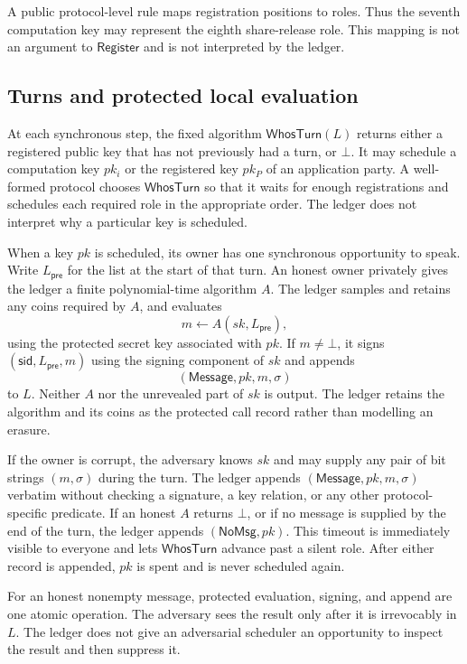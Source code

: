 A public protocol-level rule maps registration positions to roles. Thus the
seventh computation key may represent the eighth share-release role. This
mapping is not an argument to $\mathsf{Register}$ and is not interpreted by
the ledger.

\subsection{Turns and protected local evaluation}

At each synchronous step, the fixed algorithm $\mathsf{WhosTurn}(L)$ returns
either a registered public key that has not previously had a turn, or
$\bot$. It may schedule a computation key $pk_i$ or the registered key
$pk_P$ of an application party. A well-formed protocol chooses
$\mathsf{WhosTurn}$ so that it waits for enough registrations and schedules
each required role in the appropriate order. The ledger does not interpret
why a particular key is scheduled.

When a key $pk$ is scheduled, its owner has one synchronous opportunity to
speak. Write $L_{\mathsf{pre}}$ for the list at the start of that turn. An
honest owner privately gives the ledger a finite polynomial-time algorithm
$A$. The ledger samples and retains any coins required by $A$, and evaluates
\[
  m\leftarrow A(sk,L_{\mathsf{pre}}),
\]
using the protected secret key associated with $pk$. If $m\neq\bot$, it
signs $(\mathsf{sid},L_{\mathsf{pre}},m)$ using the signing component of $sk$
and appends
\[
  (\mathsf{Message},pk,m,\sigma)
\]
to $L$. Neither $A$ nor the unrevealed part of $sk$ is output. The ledger
retains the algorithm and its coins as the protected call record rather than
modelling an erasure.

If the owner is corrupt, the adversary knows $sk$ and may supply any pair of
bit strings $(m,\sigma)$ during the turn. The ledger appends
$(\mathsf{Message},pk,m,\sigma)$ verbatim without checking a signature, a key
relation, or any other protocol-specific predicate. If an
honest $A$ returns $\bot$, or if no message is supplied by the end of the
turn, the ledger appends $(\mathsf{NoMsg},pk)$. This timeout is immediately
visible to everyone and lets $\mathsf{WhosTurn}$ advance past a silent role.
After either record is appended, $pk$ is spent and is never scheduled again.

For an honest nonempty message, protected evaluation, signing, and append are
one atomic operation. The adversary sees the result only after it is
irrevocably in $L$. The ledger does not give an adversarial scheduler an
opportunity to inspect the result and then suppress it.

